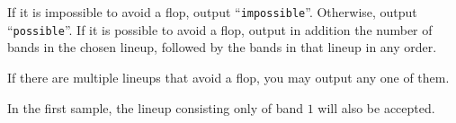 \begin{Output}
	If it is impossible to avoid a flop, output ``\texttt{impossible}''.
	Otherwise, output ``\texttt{possible}''.
	If it is possible to avoid a flop, output in addition the number of bands in the chosen lineup, followed by the bands in that lineup in any order.
	
    If there are multiple lineups that avoid a flop, you may output any one of them.
\end{Output}

\nextsample

In the first sample, the lineup consisting only of band $1$ will also be accepted.

\remainingsamples

